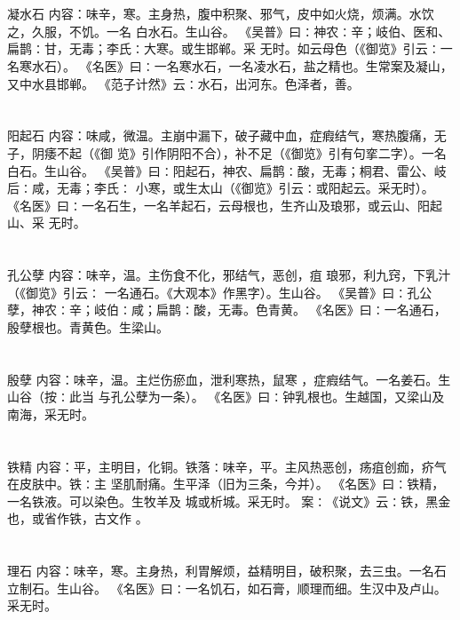 \documentclass[12pt,UTF8]{ctexbook}
\begin{document}
\section{}凝水石
内容：味辛，寒。主身热，腹中积聚、邪气，皮中如火烧，烦满。水饮之，久服，不饥。一名 
白水石。生山谷。 
《吴普》曰∶神农∶辛；岐伯、医和、扁鹊∶甘，无毒；李氏∶大寒。或生邯郸。采 
无时。如云母色（《御览》引云∶一名寒水石）。 
《名医》曰∶一名寒水石，一名凌水石，盐之精也。生常案及凝山，又中水县邯郸。 
《范子计然》云∶水石，出河东。色泽者，善。 


\section{}阳起石
内容：味咸，微温。主崩中漏下，破子藏中血，症瘕结气，寒热腹痛，无子，阴痿不起（《御 
览》引作阴阳不合），补不足（《御览》引有句挛二字）。一名白石。生山谷。 
《吴普》曰∶阳起石，神农、扁鹊∶酸，无毒；桐君、雷公、岐后∶咸，无毒；李氏∶ 
小寒，或生太山（《御览》引云∶或阳起云。采无时）。 
《名医》曰∶一名石生，一名羊起石，云母根也，生齐山及琅邪，或云山、阳起山、采 
无时。 


\section{}孔公孽
内容：味辛，温。主伤食不化，邪结气，恶创，疽 琅邪，利九窍，下乳汁（《御览》引云∶ 
一名通石。《大观本》作黑字）。生山谷。 
《吴普》曰∶孔公孽，神农∶辛；岐伯∶咸；扁鹊∶酸，无毒。色青黄。 
《名医》曰∶一名通石，殷孽根也。青黄色。生梁山。 


\section{}殷孽
内容：味辛，温。主烂伤瘀血，泄利寒热，鼠寒 ，症瘕结气。一名姜石。生山谷（按∶此当 
与孔公孽为一条）。 
《名医》曰∶钟乳根也。生越国，又梁山及南海，采无时。 


\section{}铁精
内容：平，主明目，化铜。铁落∶味辛，平。主风热恶创，疡疽创痂，疥气在皮肤中。铁∶主 
坚肌耐痛。生平泽（旧为三条，今并）。 
《名医》曰∶铁精，一名铁液。可以染色。生牧羊及 城或析城。采无时。 
案∶《说文》云∶铁，黑金也，或省作铁，古文作 。 


\section{}理石
内容：味辛，寒。主身热，利胃解烦，益精明目，破积聚，去三虫。一名石立制石。生山谷。 
《名医》曰∶一名饥石，如石膏，顺理而细。生汉中及卢山。采无时。 
\end{document}
